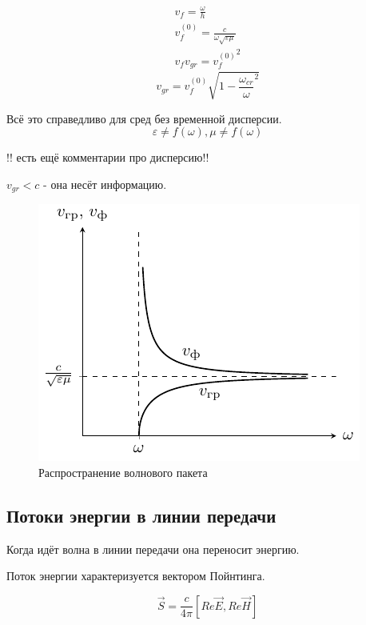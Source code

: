 \begin{enumerate}
 	\begin{gather}
 		v_{f} = \frac{\omega}{h}\\
 		v_{f}^{(0)} = \frac{c}{\omega \sqrt{\varepsilon \mu}}\\
 		v_{f} v_{gr} = {v_f^{(0)}}^2
 	\end{gather}
 	\begin{equation}
 		v_{gr} = v_{f}^{(0)} \sqrt{1 - {\frac{\omega_{cr}}{\omega}^2}}
 	\end{equation}

	Всё это справедливо для сред без временной дисперсии.
	\begin{equation}
		\varepsilon\ne f(\omega), \mu \ne f(\omega)
	\end{equation}

	!! есть ещё комментарии про дисперсию!!

	$v_{gr} < c$ - она несёт информацию.
\end{enumerate}
\begin{figure}[H]
	\centering
	\includegraphics[scale=1.5]{img/lect3_ris10}
	\caption{Распространение волнового пакета}
	\label{fig:lect3:10}
\end{figure}

\subsection{Потоки энергии в линии передачи}
Когда идёт волна в линии передачи она переносит энергию.

Поток энергии характеризуется вектором Пойнтинга.

\begin{equation}
	\vec{S} = \frac{c}{4 \pi} [ Re{\vec{E}}, Re{\vec{H}}]
\end{equation}


